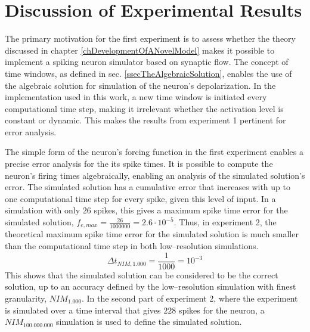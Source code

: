 \newpage

	\section{Discussion of Experimental Results}

		The primary motivation for the first experiment is to assess whether the theory discussed in chapter \ref{chDevelopmentOfANovelModel} makes it possible to implement a spiking neuron simulator based on synaptic flow.
		The concept of time windows, as defined in sec. \ref{ssecTheAlgebraicSolution}, enables the use of the algebraic solution for simulation of the neuron's depolarization. 
		In the implementation used in this work, a new time window is initiated every computational time step, making it irrelevant whether the activation level is constant or dynamic. 
		This makes the results from experiment 1 pertinent for error analysis. 

		The simple form of the neuron's forcing function in the first experiment enables a precise error analysis for the its spike times.
		It is possible to compute the neuron's firing times algebraically, enabling an analysis of the simulated solution's error.
		The simulated solution has a cumulative error that increases with up to one computational time step for every spike, given this level of input.
		In a simulation with only $26$ spikes, this gives a maximum spike time error for the simulated solution, $f_{e, max} = \frac{26}{1000000} = 2.6\cdot10^{-5}$. 
		Thus, in experiment 2, the theoretical maximum spike time error for the simulated solution is much smaller than the computational time step in both low--resolution simulations. %
		$$ \Delta t_{NIM,1.000} = \frac{1}{1000} = 10^{-3}$$
		This shows that the simulated solution can be considered to be the correct solution, up to an accuracy defined by the low--resolution simulation with finest granularity, $NIM_{1.000}$.
		In the second part of experiment 2, where the experiment is simulated over a time interval that gives $228$ spikes for the neuron, a $NIM_{100.000.000}$ simulation is used to define the simulated solution. %


